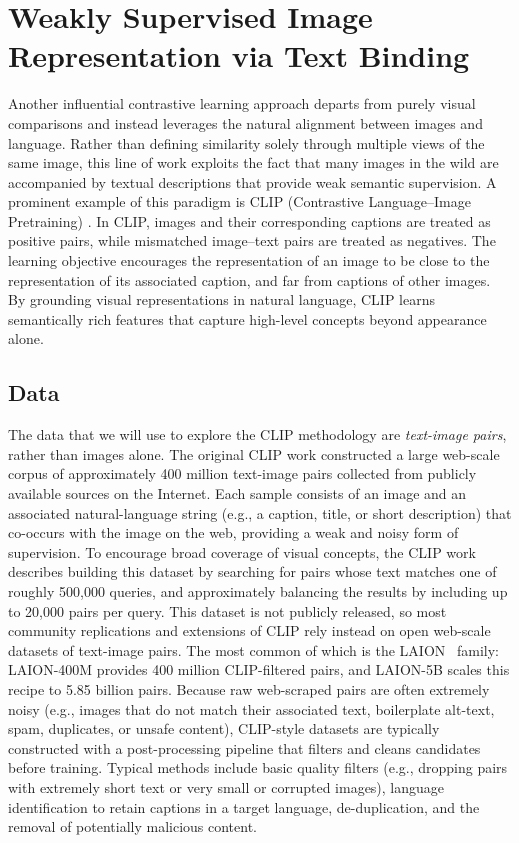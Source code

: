 \documentclass[../../book-main.tex]{subfiles}
\begin{document}
\section{Weakly Supervised Image Representation via Text Binding}\label{sec:CLIP}

Another influential contrastive learning approach departs from purely visual comparisons and instead leverages the natural alignment between images and language.
Rather than defining similarity solely through multiple views of the same image, this line of work exploits the fact that many images in the wild are accompanied by textual descriptions that provide weak semantic supervision.
A prominent example of this paradigm is CLIP (Contrastive Language--Image Pretraining) \citep{Radford2021-ir}.
In CLIP, images and their corresponding captions are treated as positive pairs, while mismatched image--text pairs are treated as negatives.
The learning objective encourages the representation of an image to be close to the representation of its associated caption, and far from captions of other images.
By grounding visual representations in natural language, CLIP learns semantically rich features that capture high-level concepts beyond appearance alone.

\subsection{Data}

The data that we will use to explore the CLIP methodology are \textit{text-image pairs}, rather than images alone.
The original CLIP work constructed a large web-scale corpus of approximately 400 million text-image pairs collected from publicly available sources on the Internet.
Each sample consists of an image and an associated natural-language string (e.g., a caption, title, or short description) that co-occurs with the image on the web, providing a weak and noisy form of supervision.
To encourage broad coverage of visual concepts, the CLIP work describes building this dataset by searching for pairs whose text matches one of roughly 500{,}000 queries, and approximately balancing the results by including up to 20{,}000 pairs per query.
This dataset is not publicly released, so most community replications and extensions of CLIP rely instead on open web-scale datasets of text-image pairs.
The most common of which is the LAION~\citep{schuhmann2022laion5bopenlargescaledataset} family: LAION-400M provides 400 million CLIP-filtered pairs, and LAION-5B scales this recipe to 5.85 billion pairs.
Because raw web-scraped pairs are often extremely noisy (e.g., images that do not match their associated text, boilerplate alt-text, spam, duplicates, or unsafe content), CLIP-style datasets are typically constructed with a post-processing pipeline that filters and cleans candidates before training.
Typical methods include basic quality filters (e.g., dropping pairs with extremely short text or very small or corrupted images), language identification to retain captions in a target language, de-duplication, and the removal of potentially malicious content.
\end{document}
